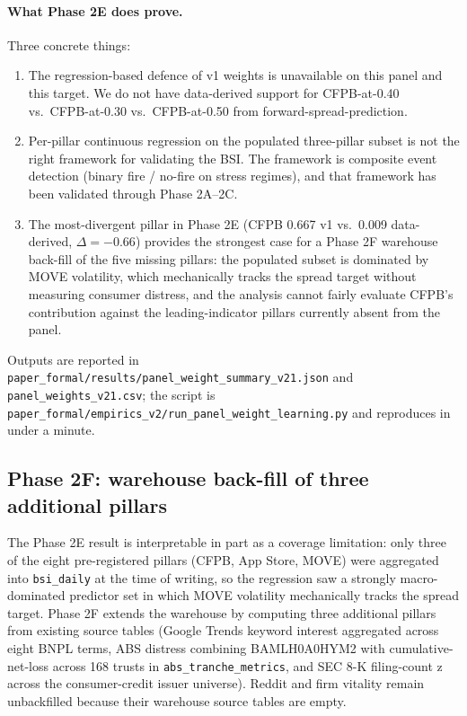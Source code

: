 \documentclass[11pt,a4paper]{article}
\begin{document}
\paragraph{What Phase 2E does prove.} Three concrete things:
\begin{enumerate}
\item The regression-based defence of v1 weights is unavailable on this panel and this target. We do not have data-derived support for CFPB-at-0.40 vs.\ CFPB-at-0.30 vs.\ CFPB-at-0.50 from forward-spread-prediction.
\item Per-pillar continuous regression on the populated three-pillar subset is not the right framework for validating the BSI. The framework is composite event detection (binary fire / no-fire on stress regimes), and that framework has been validated through Phase 2A--2C.
\item The most-divergent pillar in Phase 2E (CFPB 0.667 v1 vs.\ 0.009 data-derived, $\Delta = -0.66$) provides the strongest case for a Phase 2F warehouse back-fill of the five missing pillars: the populated subset is dominated by MOVE volatility, which mechanically tracks the spread target without measuring consumer distress, and the analysis cannot fairly evaluate CFPB's contribution against the leading-indicator pillars currently absent from the panel.
\end{enumerate}

Outputs are reported in \texttt{paper\_formal/results/panel\_weight\_summary\_v21.json} and \texttt{panel\_weights\_v21.csv}; the script is \texttt{paper\_formal/empirics\_v2/run\_panel\_weight\_learning.py} and reproduces in under a minute.

\subsection{Phase 2F: warehouse back-fill of three additional pillars}\label{sec:results_phase2f}

The Phase 2E result is interpretable in part as a coverage limitation: only three of the eight pre-registered pillars (CFPB, App Store, MOVE) were aggregated into \texttt{bsi\_daily} at the time of writing, so the regression saw a strongly macro-dominated predictor set in which MOVE volatility mechanically tracks the spread target. Phase 2F extends the warehouse by computing three additional pillars from existing source tables (Google Trends keyword interest aggregated across eight BNPL terms, ABS distress combining BAMLH0A0HYM2 with cumulative-net-loss across 168 trusts in \texttt{abs\_tranche\_metrics}, and SEC 8-K filing-count z across the consumer-credit issuer universe). Reddit and firm vitality remain unbackfilled because their warehouse source tables are empty.
\end{document}
